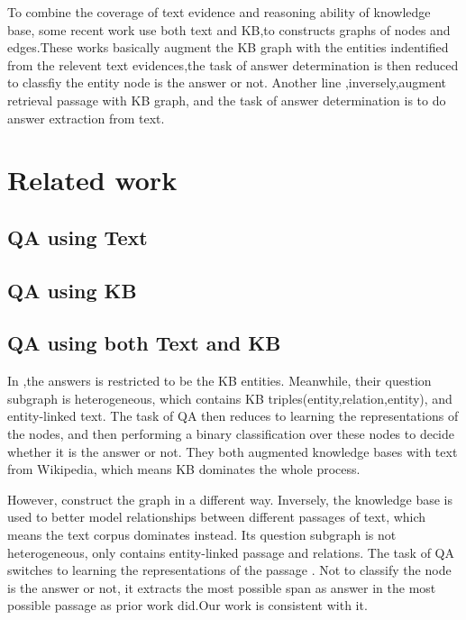 \documentclass[sigconf]{acmart}
\begin{document}
		To combine the coverage of text evidence and reasoning ability of knowledge base, some recent work  use both text and KB,to constructs graphs of nodes and edges\cite{sun2018open,sun2019pullnet,xiong2019improving}.These works basically augment the KB graph with the entities indentified from the relevent text evidences,the task of answer determination is then reduced to classfiy the entity node is the answer or not.
		Another line\cite{min2019knowledge,ding2019cognitive} ,inversely,augment retrieval passage with KB graph, and the task of answer determination is to do answer extraction from text.
		
	\section{Related work}
	\subsection{QA using Text}
	
	\subsection{QA using KB}
	\subsection{QA using both Text and KB}
	In \cite{sun2018open,sun2019pullnet,xiong2019improving},the  answers is restricted to be the KB entities. Meanwhile, their question subgraph is heterogeneous, which contains   KB triples(entity,relation,entity), and entity-linked text. The task of QA then reduces to learning the representations of the nodes, and then performing a binary classification over these nodes to decide whether it is the answer or not. They both augmented knowledge bases with text from Wikipedia, which means KB dominates the whole process.
	
	However,\cite{min2019knowledge} construct the graph in a different way.  Inversely, the knowledge base is used to better model relationships between different passages of text, which means the text corpus dominates instead. Its question subgraph is not heterogeneous, only contains entity-linked passage and relations. The task of QA  switches to learning the representations of the passage . Not to classify the node is the answer or not, it extracts the most possible span as answer in the most possible passage as prior work did.Our work is consistent with it.
	
\end{document}
